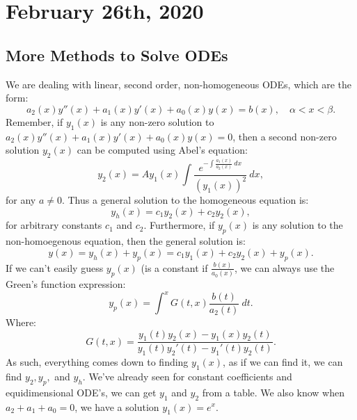 \documentclass[../main/main.tex]{subfiles}
\begin{document}
\section{February 26th, 2020}
\subsection{More Methods to Solve ODEs}
We are dealing with linear, second order, non-homogeneous ODEs, which are the form: \[
	a_2(x)y''(x) + a_1(x) y'(x)+a_0(x)y(x) = b(x), \quad \alpha < x < \beta
.\] Remember, if $y_1(x)$ is any non-zero solution to $a_2(x)y''(x) + a_1(x)y'(x)+a_0(x)y(x)=0$, then a second non-zero solution $y_2(x)$ can be computed using Abel's equation: \[
y_2(x) = Ay_1(x) \int \frac{e^{-\int \frac{a_1(x)}{a_2(x)}~dx}}{(y_1(x))^2}~dx
,\] for any $a\neq 0$. Thus a general solution to the homogeneous equation is: \[
y_h(x) = c_1 y_2(x) + c_2 y_2(x)
,\] for arbitrary constants $c_1$ and $c_2$. Furthermore, if $y_p(x)$ is any solution to the non-homoegenous equation, then the general solution is: \[
	y(x) = y_h(x) + y_p(x) = c_1y_1(x) + c_2y_2(x) + y_p(x)
.\] If we can't easily guess $y_p(x)$ (is a constant if $\frac{b(x)}{a_0(x)}$, we can always use the Green's function expression: \[
y_p(x) = \int^x G(t,x) \frac{b(t)}{a_2(t)}~dt
.\] Where: \[
G(t,x) = \frac{y_1(t)y_2(x)-y_1(x)y_2(t)}{y_1(t)y_2'(t)-y_1'(t)y_2(t)}
.\] As such, everything comes down to finding $y_1(x)$, as if we can find it, we can find $y_2, y_p,$ and $y_h$. We've already seen for constant coefficients and equidimensional ODE's, we can get $y_1$ and $y_2$ from a table. We also know when $a_2+a_1+a_0=0$, we have a solution $y_1(x) = e^{x}$.\\
\end{document}
